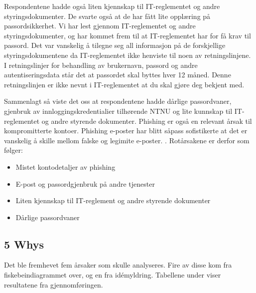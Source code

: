 Respondentene hadde også liten kjennskap til IT-reglementet og andre styringsdokumenter. De svarte også at de har fått lite opplæring på passordsikkerhet. Vi har lest gjennom IT-reglementet og andre styringsdokumenter, og har kommet frem til at IT-reglementet har for få krav til passord. Det var vanskelig å tilegne seg all informasjon på de forskjellige styringsdokumentene da IT-reglementet ikke henviste til noen av retningslinjene. I retningslinjer for behandling av brukernavn, passord og andre autentiseringsdata \cite{RetnBPA} står det at passordet skal byttes hver 12 måned. Denne retningslinjen er ikke nevnt i IT-reglementet at du skal gjøre deg bekjent med. 

Sammenlagt så viste det oss at respondentene hadde dårlige passordvaner, gjenbruk av innloggingskredentialier tilhørende NTNU og lite kunnskap til IT-reglementet og andre styrende dokumenter. Phishing er også en relevant årsak til kompromitterte kontoer. Phishing e-poster har blitt såpass sofistikerte at det er vanskelig å skille mellom falske og legimite e-poster. \cite{SophPhish}. Rotårsakene er derfor som følger: 

\begin{itemize}
    \item Mistet kontodetaljer av phishing
    \item E-post og passordgjenbruk på andre tjenester
    \item Liten kjennskap til IT-reglement og andre styrende dokumenter
    \item Dårlige passordvaner
\end{itemize}

\subsection{5 Whys}
Det ble fremhevet fem årsaker som skulle analyseres. Fire av disse kom fra fiskebeindiagrammet over, og en fra idémyldring. Tabellene under viser resultatene fra gjennomføringen. 

